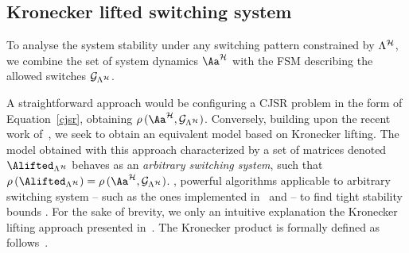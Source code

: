 \subsection{Kronecker lifted switching system}%
\label{sec:system_dynamics}

%
To analyse the system stability under any switching pattern constrained by $\Lambda^{\mathcal{H}}$, we combine the set of system dynamics $\Aa^\strat$ with the FSM describing the allowed switches $\mathcal{G}_{\Lambda^{\mathcal{H}}}$.

A straightforward approach would be configuring a CJSR problem in the form of Equation~\eqref{cjsr}, obtaining $\rho\,(\Aa^\strat,\GG{\Lambda^\strat})$.
%
Conversely, building upon the recent work of~\cite{xu2020approximation}, we seek to obtain an equivalent  model based on Kronecker lifting.
The model obtained with this approach  characterized by a set of matrices denoted  $\Alifted_{\Lambda^\strat}$  behaves as an \emph{arbitrary switching system}, such that $\rho\,(\Alifted_{\Lambda^\strat})= \rho\,(\Aa^{\strat},\GG{\Lambda^\strat})$.
, powerful algorithms applicable to arbitrary switching system -- such as the ones implemented in~\cite{vankeerberghen2014jsr} and \cite{sparsejsr} --  to find tight stability bounds .
For the sake of brevity, we only  an intuitive explanation  the Kronecker lifting approach presented in~\cite{xu2020approximation}.
The Kronecker product is formally defined as follows~\cite{horn2012matrix}.

